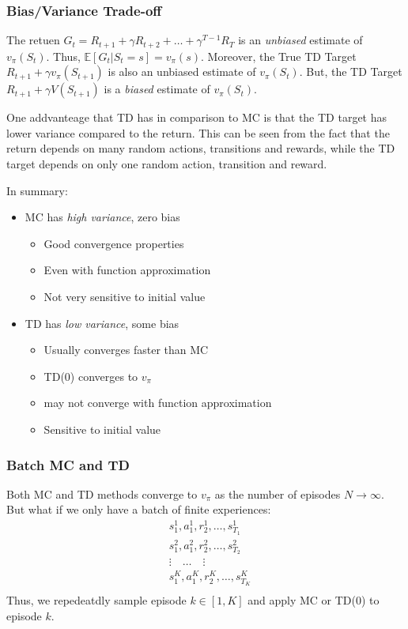 \subsubsection*{Bias/Variance Trade-off}
The retuen \(G_t = R_{t+1} + \gamma R_{t+2} + \dots + \gamma^{T-1}R_T\) is an \emph{unbiased}
estimate of \(v_{\pi}(S_t)\). Thus, \(\mathbb{E}[G_t | S_t = s] = v_{\pi}(s)\). Moreover,
the True TD Target \(R_{t+1} + \gamma v_\pi (S_{t+1})\) is also an unbiased estimate of
\(v_{\pi}(S_t)\). 
But, the TD Target \(R_{t+1} + \gamma V(S_{t+1})\) is a \emph{biased} estimate of \(v_{\pi}(S_t)\).

One addvanteage that TD has in comparison to MC is that the TD target has lower variance
compared to the return. This can be seen from the fact that the return depends 
on many random actions, transitions and rewards, while the TD target depends on only one
random action, transition and reward.

In summary:
\begin{itemize}
    \item MC has \emph{high variance}, zero bias
    \begin{itemize}
        \item Good convergence properties
        \item Even with function approximation
        \item Not very sensitive to initial value
    \end{itemize}
    \item TD has \emph{low variance}, some bias
    \begin{itemize}
        \item Usually converges faster than MC
        \item TD(0) converges to \(v_{\pi}\)
        \item may not converge with function approximation
        \item Sensitive to initial value
    \end{itemize}
\end{itemize}

\subsubsection{Batch MC and TD}
Both MC and TD methods converge to \(v_{\pi}\) as the number of episodes \(N \to \infty\). 
But what if we only have a batch of finite experiences:
\[
    \begin{aligned}
        & s^1_1, a^1_1, r^1_2, \dots, s^1_{T_1} \\
        & s^2_1, a^2_1, r^2_2, \dots, s^2_{T_2} \\
        &\vdots \quad \dots  \quad \vdots \\
        & s^K_1, a^K_1, r^K_2, \dots, s^K_{T_K} \\
    \end{aligned}
\]
Thus, we repedeatdly sample episode \(k \in [1,K]\) and apply MC or TD(0) to
episode \(k\).

